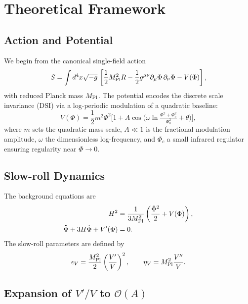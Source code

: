 \documentclass[reprint, amsmath, amssymb, aps, prd, nofootinbib]{revtex4-2}
\begin{document}
\section{Theoretical Framework}

\subsection{Action and Potential}

We begin from the canonical single-field action
\begin{equation}
S = \int d^4x \sqrt{-g}\, \left[ \frac{1}{2} M_{\rm Pl}^2 R
- \frac{1}{2} g^{\mu\nu} \partial_\mu \Phi \,\partial_\nu \Phi
- V(\Phi) \right],
\end{equation}
with reduced Planck mass $M_{\rm Pl}$. The potential encodes the discrete scale
invariance (DSI) via a log-periodic modulation of a quadratic baseline:
\begin{equation}
V(\Phi) = \frac{1}{2} m^2 \Phi^2 \Big[ 1 + A \cos\!\big(
\omega \ln \tfrac{\Phi^2 + \Phi_c^2}{\Phi_0^2} + \theta \big) \Big],
\label{eq:V}
\end{equation}
where $m$ sets the quadratic mass scale, $A \ll 1$ is the fractional modulation
amplitude, $\omega$ the dimensionless log-frequency, and $\Phi_c$ a small
infrared regulator ensuring regularity near $\Phi \to 0$.

\subsection{Slow-roll Dynamics}

The background equations are
\begin{align}
H^2 &= \frac{1}{3 M_{\rm Pl}^2}\left(\frac{\dot\Phi^2}{2}+V(\Phi)\right),\\
\ddot\Phi + 3H \dot\Phi + V'(\Phi) &= 0.
\end{align}
The slow-roll parameters are defined by
\begin{equation}
\epsilon_V = \frac{M_{\rm Pl}^2}{2} \left(\frac{V'}{V}\right)^2, \qquad
\eta_V = M_{\rm Pl}^2 \frac{V''}{V}.
\end{equation}

\subsection{Expansion of $V'/V$ to $\mathcal{O}(A)$}
\end{document}
